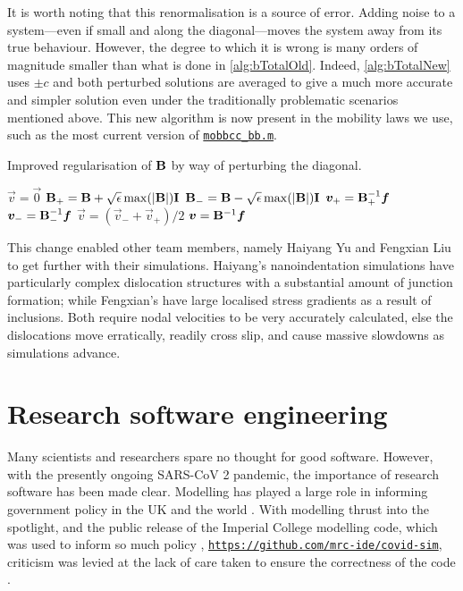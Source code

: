 It is worth noting that this renormalisation is a source of error. Adding noise to a system---even if small and along the diagonal---moves the system away from its true behaviour. However, the degree to which it is wrong is many orders of magnitude smaller than what is done in \cref{alg:bTotalOld}. Indeed, \cref{alg:bTotalNew} uses $\pm c $ and both perturbed solutions are averaged to give a much more accurate and simpler solution even under the traditionally problematic scenarios mentioned above. This new algorithm is now present in the mobility laws we use, such as the most current version of \href{https://github.com/TarletonGroup/EasyDD/blob/372984499dd60136fc7badabd6cee192058d55d9/src/mobbcc_bb1b.m#L199}{\texttt{mobbcc\_bb.m}}.
\begin{algorithm}
    \caption[Dampening the drag matrix inversion singularity.]{Improved regularisation of $\mathbf{B}$ by way of perturbing the diagonal.}
    \label{alg:bTotalNew}
    \begin{algorithmic}
        \State $\vec{v} = \vec{0}$
        \State $\mathbf{B}_+ = \mathbf{B} + \sqrt{\epsilon} \max(\mathbf{\lvert B\rvert}) \mathbf{I}$
        \State $\mathbf{B}_- = \mathbf{B} - \sqrt{\epsilon} \max(\mathbf{\lvert B\rvert}) \mathbf{I}$
        \State $\vec{v}_+ = \mtx{B}_+^{-1} \vec{f}$
        \State $\vec{v}_- = \mtx{B}_-^{-1} \vec{f}$
        \State $\vec{v} = (\vec{v}_- + \vec{v}_+)/2$
        \Else
        \State $\vec{v} = \mtx{B}^{-1} \vec{f}$
        \EndIf
    \end{algorithmic}
\end{algorithm}

This change enabled other team members, namely Haiyang Yu and Fengxian Liu to get further with their simulations. Haiyang's nanoindentation simulations have particularly complex dislocation structures with a substantial amount of junction formation; while Fengxian's have large localised stress gradients as a result of inclusions. Both require nodal velocities to be very accurately calculated, else the dislocations move erratically, readily cross slip, and cause massive slowdowns as simulations advance.

\section{Research software engineering}
\label{s:rse}

Many scientists and researchers spare no thought for good software. However, with the presently ongoing SARS-CoV 2 pandemic, the importance of research software has been made clear. Modelling has played a large role in informing government policy in the UK and the world \cite{covidScotland,covidUK1,covidUK2}. With modelling thrust into the spotlight, and the public release of the Imperial College modelling code, which was used to inform so much policy \cite{covidUK2}, \href{https://github.com/mrc-ide/covid-sim}{\texttt{https://github.com/mrc-ide/covid-sim}}, criticism was levied at the lack of care taken to ensure the correctness of the code \cite{natureModelCritique}.

